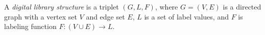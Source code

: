 \documentclass[12pt]{article}
\begin{document}
A {\em digital library structure} is a triplet $(G,L,F)$, where $G=(V,E)$ is a directed graph with a vertex set 
$V$ and edge set $E$, $L$ is a set of label values, and $F$ is labeling function 
$F:(V\cup E)\rightarrow L$.
\end{document}
